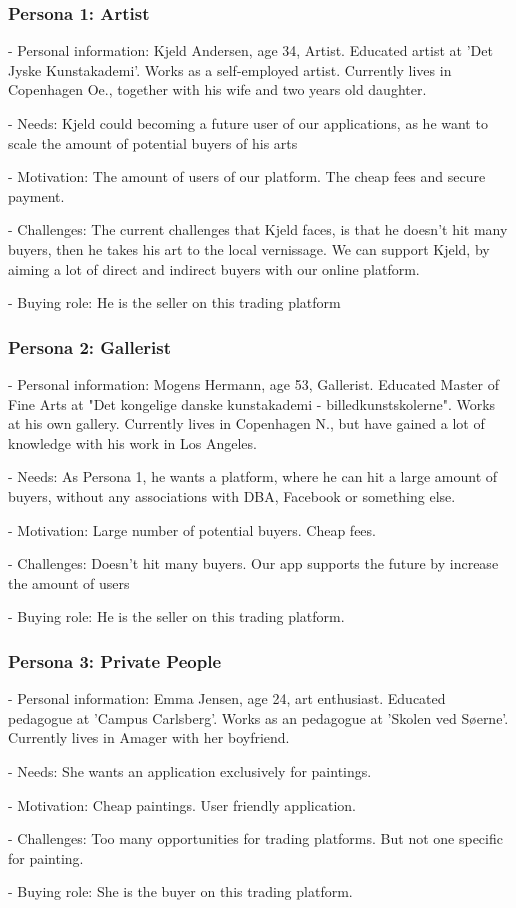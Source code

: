\subsubsection*{Persona 1: Artist}
- Personal information: Kjeld Andersen, age 34, Artist. Educated artist at 'Det Jyske Kunstakademi'. Works as a self-employed artist. Currently lives in Copenhagen Oe., together with his wife and two years old daughter.

- Needs: Kjeld could becoming a future user of our applications, as he want to scale the amount of potential buyers of his arts

- Motivation: The amount of users of our platform. The cheap fees and secure payment.

- Challenges: The current challenges that Kjeld faces, is that he doesn't hit many buyers, then he takes his art to the local vernissage. We can support Kjeld, by aiming a lot of direct and indirect buyers with our online platform.

- Buying role: He is the seller on this trading platform

\subsubsection{Persona 2: Gallerist}
- Personal information: Mogens Hermann, age 53, Gallerist. Educated Master of Fine Arts at "Det kongelige danske kunstakademi - billedkunstskolerne". Works at his own gallery. Currently lives in Copenhagen N., but have gained a lot of knowledge with his work in Los Angeles. 

- Needs: As Persona 1, he wants a platform, where he can hit a large amount of buyers, without any associations with DBA, Facebook or something else. 

- Motivation: Large number of potential buyers. Cheap fees. 

- Challenges: Doesn't hit many buyers. Our app supports the future by increase the amount of users

- Buying role: He is the seller on this trading platform.

\subsubsection{Persona 3: Private People}
- Personal information: Emma Jensen, age 24, art enthusiast. Educated pedagogue at 'Campus Carlsberg'. Works as an pedagogue at 'Skolen ved Søerne'. Currently lives in Amager with her boyfriend.

- Needs: She wants an application exclusively for paintings.

- Motivation: Cheap paintings. User friendly application. 

- Challenges: Too many opportunities for trading platforms. But not one specific for painting. 

- Buying role: She is the buyer on this trading platform.